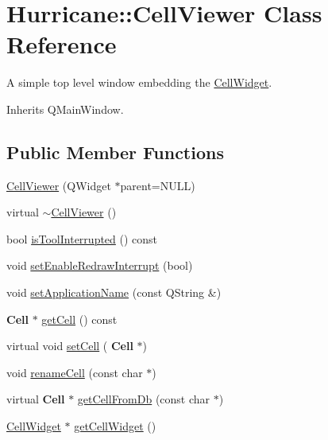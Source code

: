 \hypertarget{classHurricane_1_1CellViewer}{}\section{Hurricane\+:\+:Cell\+Viewer Class Reference}
\label{classHurricane_1_1CellViewer}


A simple top level window embedding the \mbox{\hyperlink{classHurricane_1_1CellWidget}{Cell\+Widget}}.  




Inherits Q\+Main\+Window.

\subsection*{Public Member Functions}
\begin{DoxyCompactItemize}
\item 
\mbox{\hyperlink{classHurricane_1_1CellViewer_a94abd334392f43bf92548ee1153be5e1}{Cell\+Viewer}} (Q\+Widget $\ast$parent=N\+U\+LL)
\item 
virtual \mbox{\hyperlink{classHurricane_1_1CellViewer_ad2573bba4536bbf2b074d98f21711fe8}{$\sim$\+Cell\+Viewer}} ()
\item 
bool \mbox{\hyperlink{classHurricane_1_1CellViewer_ab869899320b57cb86d8080593d385eaf}{is\+Tool\+Interrupted}} () const
\item 
void \mbox{\hyperlink{classHurricane_1_1CellViewer_a356453d6430cc64c794e49404a8657b0}{set\+Enable\+Redraw\+Interrupt}} (bool)
\item 
void \mbox{\hyperlink{classHurricane_1_1CellViewer_a961c789cdae39edad13f171da05f7930}{set\+Application\+Name}} (const Q\+String \&)
\item 
\textbf{ Cell} $\ast$ \mbox{\hyperlink{classHurricane_1_1CellViewer_af45f807c9d7728a2ecf3184e731e53e0}{get\+Cell}} () const
\item 
virtual void \mbox{\hyperlink{classHurricane_1_1CellViewer_a5d4707b5e364b8a3a36857103bdac45d}{set\+Cell}} (\textbf{ Cell} $\ast$)
\item 
void \mbox{\hyperlink{classHurricane_1_1CellViewer_ae5d3d8c58dee944d99375650c3166587}{rename\+Cell}} (const char $\ast$)
\item 
virtual \textbf{ Cell} $\ast$ \mbox{\hyperlink{classHurricane_1_1CellViewer_a0ea301f7e85f936c38b5cd59e3752309}{get\+Cell\+From\+Db}} (const char $\ast$)
\item 
\mbox{\hyperlink{classHurricane_1_1CellWidget}{Cell\+Widget}} $\ast$ \mbox{\hyperlink{classHurricane_1_1CellViewer_a1d57547e30b1fb51aec2d0f254be6d3e}{get\+Cell\+Widget}} ()

\end{DoxyCompactItemize}
